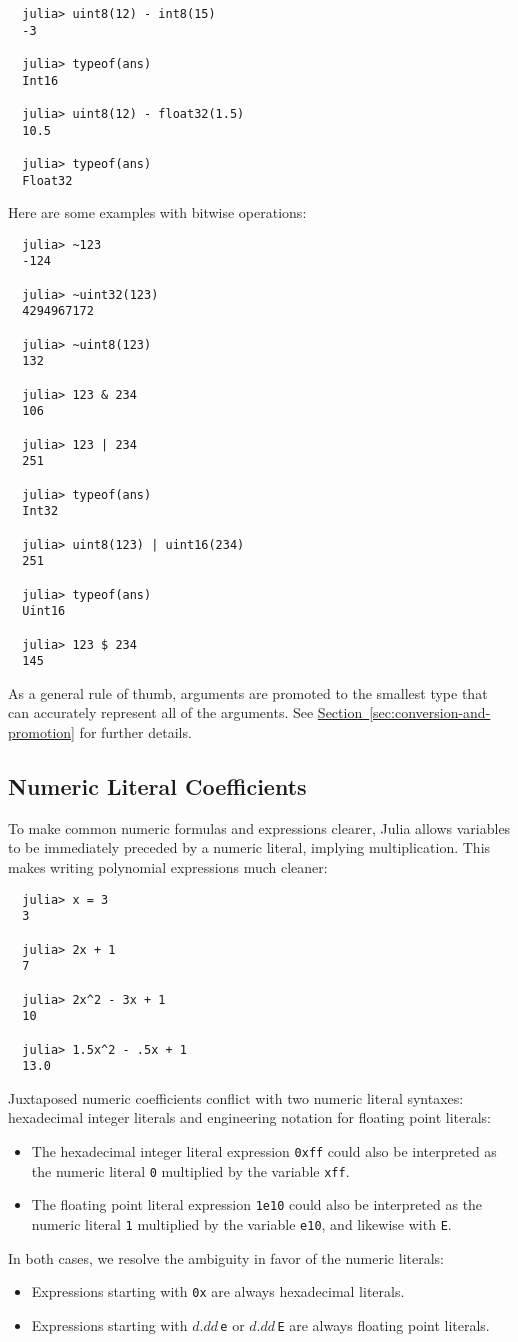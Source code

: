 \documentclass{article}
\newcommand{\Section}[1]{\hyperref[sec:#1]{Section~\ref*{sec:#1}}}
\begin{document}
\begin{verbatim}
  julia> uint8(12) - int8(15)
  -3

  julia> typeof(ans)
  Int16

  julia> uint8(12) - float32(1.5)
  10.5

  julia> typeof(ans)
  Float32
\end{verbatim}
Here are some examples with bitwise operations:
\begin{verbatim}
  julia> ~123
  -124

  julia> ~uint32(123)
  4294967172

  julia> ~uint8(123)
  132

  julia> 123 & 234
  106

  julia> 123 | 234
  251

  julia> typeof(ans)
  Int32

  julia> uint8(123) | uint16(234)
  251

  julia> typeof(ans)
  Uint16

  julia> 123 $ 234
  145
\end{verbatim}
As a general rule of thumb, arguments are promoted to the smallest type that can accurately represent all of the arguments. See \Section{conversion-and-promotion} for further details.

\subsection{Numeric Literal Coefficients}

To make common numeric formulas and expressions clearer, Julia allows variables to be immediately preceded by a numeric literal, implying multiplication.
This makes writing polynomial expressions much cleaner:
\begin{verbatim}
  julia> x = 3
  3

  julia> 2x + 1
  7

  julia> 2x^2 - 3x + 1
  10

  julia> 1.5x^2 - .5x + 1
  13.0
\end{verbatim}
Juxtaposed numeric coefficients conflict with two numeric literal syntaxes:
hexadecimal integer literals and engineering notation for floating point literals:
\begin{itemize}
\item The hexadecimal integer literal expression \verb|0xff| could also be interpreted as the numeric literal \verb|0| multiplied by the variable \verb|xff|.
\item The floating point literal expression \verb|1e10| could also be interpreted as the numeric literal \verb|1| multiplied by the variable \verb|e10|, and likewise with \verb|E|.
\end{itemize}
In both cases, we resolve the ambiguity in favor of the numeric literals:
\begin{itemize}
\item Expressions starting with \verb|0x| are always hexadecimal literals.
\item Expressions starting with $d.dd$\,\verb|e| or $d.dd$\,\verb|E| are always floating point literals.
\end{itemize}
\end{document}
